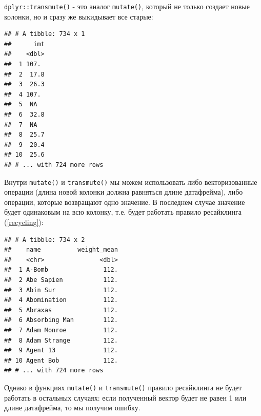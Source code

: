 \documentclass[
]{book}
\newenvironment{Shaded}{\begin{snugshade}}{\end{snugshade}}
\newcommand{\DataTypeTok}[1]{\textcolor[rgb]{0.13,0.29,0.53}{#1}}
\newcommand{\DecValTok}[1]{\textcolor[rgb]{0.00,0.00,0.81}{#1}}
\newcommand{\KeywordTok}[1]{\textcolor[rgb]{0.13,0.29,0.53}{\textbf{#1}}}
\newcommand{\NormalTok}[1]{#1}
\newcommand{\OperatorTok}[1]{\textcolor[rgb]{0.81,0.36,0.00}{\textbf{#1}}}
\newcommand{\OtherTok}[1]{\textcolor[rgb]{0.56,0.35,0.01}{#1}}
\newcommand{\StringTok}[1]{\textcolor[rgb]{0.31,0.60,0.02}{#1}}
\begin{document}
\texttt{dplyr::transmute()} - это аналог \texttt{mutate()}, который не только создает новые колонки, но и сразу же выкидывает все старые:

\begin{Shaded}
\end{Shaded}

\begin{verbatim}
## # A tibble: 734 x 1
##      imt
##    <dbl>
##  1 107. 
##  2  17.8
##  3  26.3
##  4 107. 
##  5  NA  
##  6  32.8
##  7  NA  
##  8  25.7
##  9  20.4
## 10  25.6
## # ... with 724 more rows
\end{verbatim}

Внутри \texttt{mutate()} и \texttt{transmute()} мы можем использовать либо векторизованные операции (длина новой колонки должна равняться длине датафрейма), либо операции, которые возвращают одно значение. В последнем случае значение будет одинаковым на всю колонку, т.е. будет работать правило ресайклинга (\ref{recycling}):

\begin{Shaded}
\end{Shaded}

\begin{verbatim}
## # A tibble: 734 x 2
##    name          weight_mean
##    <chr>               <dbl>
##  1 A-Bomb               112.
##  2 Abe Sapien           112.
##  3 Abin Sur             112.
##  4 Abomination          112.
##  5 Abraxas              112.
##  6 Absorbing Man        112.
##  7 Adam Monroe          112.
##  8 Adam Strange         112.
##  9 Agent 13             112.
## 10 Agent Bob            112.
## # ... with 724 more rows
\end{verbatim}

Однако в функциях \texttt{mutate()} и \texttt{transmute()} правило ресайклинга не будет работать в остальных случаях: если полученный вектор будет не равен 1 или длине датафрейма, то мы получим ошибку.
\end{document}
